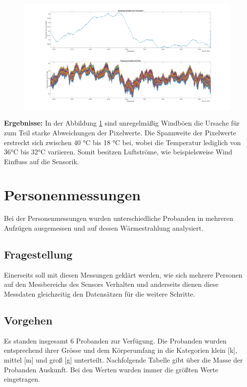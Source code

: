 \begin{figure}[H]
	\centering
	\includegraphics[width=1.0\textwidth]{fig/Temperaturverhaltenwind}
	\caption{}
	\label{fig:temperaturverhaltenwind}
\end{figure}

\textbf{Ergebnisse:} In der Abbildung \ref{fig:temperaturverhaltenwind} sind unregelmäßig Windböen die Ursache für zum Teil starke Abweichungen der Pixelwerte. Die Spannweite der Pixelwerte erstreckt sich zwischen 40 °C bis 18 °C bei, wobei die Temperatur lediglich von 36°C bis 32°C variieren. Somit besitzen Luftströme, wie beispielsweise Wind Einfluss auf die Sensorik. 


\section{Personenmessungen}
Bei der Personenmessungen wurden unterschiedliche Probanden in mehreren Aufzügen ausgemessen und auf dessen Wärmestrahlung analysiert. 

\subsection{Fragestellung} Einerseits soll mit diesen Messungen geklärt werden, wie sich mehrere Personen auf den Messbereichs des Sensors Verhalten und anderseits dienen diese Messdaten gleichzeitig den Datensätzen für die weitere Schritte.

\subsection{Vorgehen}
Es standen insgesamt 6 Probanden zur Verfügung. Die Probanden wurden entsprechend ihrer Grösse und dem Körperumfang in die Kategorien klein [k], mittel [m] und groß [g] unterteilt. Nachfolgende Tabelle gibt über die Masse der Probanden Auskunft. Bei den Werten wurden immer die größten Werte eingetragen.

